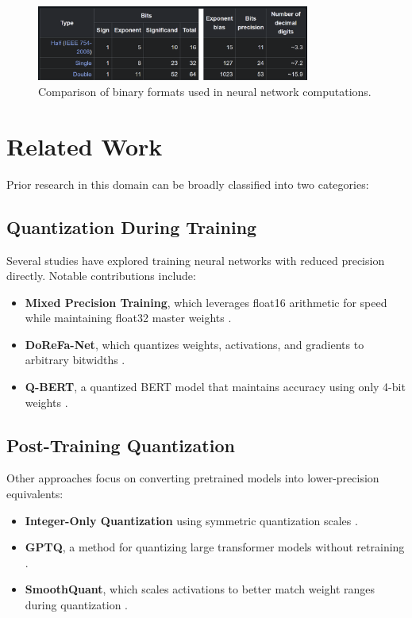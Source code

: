 \documentclass[11pt]{article}
\begin{document}
	\begin{figure}[H]
    	\centering
    	\includegraphics[width=0.8\textwidth]{figures/binary-formats.png}
    	\caption{Comparison of binary formats used in neural network computations.}
	\end{figure}

	\section{Related Work}

	Prior research in this domain can be broadly classified into two categories:

	\subsection*{Quantization During Training}
	Several studies have explored training neural networks with reduced precision directly. Notable contributions include:
	\begin{itemize}
    	\item \textbf{Mixed Precision Training}, which leverages float16 arithmetic for speed while maintaining float32 master weights \cite{micikevicius2017mixed}.
    	\item \textbf{DoReFa-Net}, which quantizes weights, activations, and gradients to arbitrary bitwidths \cite{zhou2018dorefa}.
    	\item \textbf{Q-BERT}, a quantized BERT model that maintains accuracy using only 4-bit weights \cite{shen2020qbert}.
	\end{itemize}

	\subsection*{Post-Training Quantization}
	Other approaches focus on converting pretrained models into lower-precision equivalents:
	\begin{itemize}
    	\item \textbf{Integer-Only Quantization} using symmetric quantization scales \cite{jacob2018quantization}.
    	\item \textbf{GPTQ}, a method for quantizing large transformer models without retraining \cite{frantar2022gptq}.
    	\item \textbf{SmoothQuant}, which scales activations to better match weight ranges during quantization \cite{xiao2024smoothquant}.
	\end{itemize}
\end{document}
